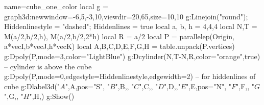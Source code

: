 \documentclass[12pt]{article}
\begin{document}
\begin{luadraw}{name=cube_one_color}
local g = graph3d:new{window={-6,5,-3,10},viewdir={20,65},size={10,10}}
g:Linejoin("round"); Hiddenlinestyle = "dashed"; Hiddenlines = true
local a, b, h = 4,4,4
local N,T = M(a/2,b/2,h), M(a/2,b/2,2*h)
local R = a/2
local P = parallelep(Origin, a*vecI,b*vecJ,h*vecK)
local A,B,C,D,E,F,G,H = table.unpack(P.vertices)
g:Dpoly(P,{mode=3,color="LightBlue"})
g:Dcylinder(N,T-N,R,{color="orange"},true) -- cylinder is above the cube
g:Dpoly(P,{mode=0,edgestyle=Hiddenlinestyle,edgewidth=2}) -- for hiddenlines of cube
g:Dlabel3d("$A$",A,{pos="S"}, "$B$",B,{}, "$C$",C,{}, "$D$",D,{},"$E$",E,{pos="N"}, "$F$",F,{}, "$G$",G,{}, "$H$",H,{})
g:Show()
\end{luadraw}
\end{document}
